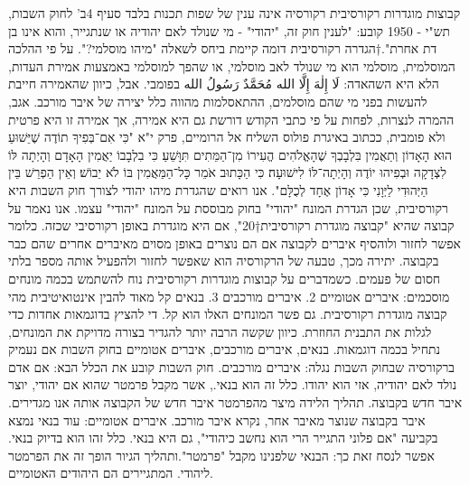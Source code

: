 {קבוצות מוגדרות רקורסיבית
רקורסיה אינה ענין של שפות תכנות בלבד
סעיף 4ב' לחוק השבות, תש"י - 1950 קובע:
"לענין חוק זה, "יהודי" - מי שנולד לאם יהודיה או שנתגייר, והוא אינו בן דת אחרת".†{הגדרה רקורסיבית דומה קיימת ביחס לשאלה "מיהו מוסלמי?". על פי ההלכה המוסלמית, מוסלמי הוא מי שנולד לאב מוסלמי, או שהפך למוסלמי באמצעות אמירת העדות, הלא היא השהאדה: لَا إِلٰهَ إِلَّا الله مُحَمَّدٌ رَسُولُ الله בפומבי. אבל, כיוון שהאמירה חייבת להעשות בפני מי שהם מוסלמים, ההתאסלמות מהווה כלל יצירה של איבר מורכב. אגב, ההמרה לנצרות, לפחות על פי כתבי הקודש דורשת גם היא אמירה, אך אמירה זו היא פרטית ולא פומבית, ככתוב באיגרת פולוס השליח אל הרומיים, פרק י"א "כִּי אִם־בְּפִיךָ תוֹדֶה שֶׁיֵּשׁוּעַ הוּא הָאָדוֹן וְתַאֲמִין בִּלְבָבְךָ שֶׁהָאֱלֹהִים הֱעִירוֹ מִן־הַמֵּתִים תִּוָּשֵׁעַ׃ כִּי בִלְבָבוֹ יַאֲמִין הָאָדָם וְהָיְתָה לּוֹ לִצְדָקָה וּבְפִיהוּ יוֹדֶה וְהָיְתָה־לּוֹ לִישׁוּעָה׃ כִּי הַכָּתוּב אֹמֵר כָּל־הַמַּאֲמִין בּוֹ לֹא יֵבוֹשׁ׃ וְאֵין הַפְרֵשׁ בֵּין הַיְּהוּדִי לַיְּוָנִי כִּי אָדוֹן אֶחָד לְכֻלָּם".}
אנו רואים שהגדרת מיהו יהודי לצורך חוק השבות היא רקורסיבית, שכן הגדרת המונח "יהודי" בחוק מבוססת על המונח "יהודי" עצמו.
אנו נאמר על קבוצה שהיא "קבוצה מוגדרת רקורסיבית†{20}", אם היא מוגדרת באופן רקורסיבי שכזה. כלומר אפשר לחזור ולוהסיף איברים לקבוצה אם הם נוצרים באופן מסוים מאיברים אחרים שהם כבר בקבוצה. יתירה מכך, טבעה של הרקורסיה הוא שאפשר לחזור ולהפעיל אותה מספר בלתי חסום של פעמים.
כשמדברים על קבוצות מוגדרות רקורסיבית נוח להשתמש בכמה מונחים מוסכמים:
איברים אטומיים
2. איברים מורכבים
3. בנאים
קל מאוד להבין אינטואיטיבית מהי קבוצה מוגדרת רקורסיבית. גם פשר המונחים האלו הוא קל. די להציץ בדוגמאות אחדות כדי לגלות את התבנית החוזרת. כיוון שקשה הרבה יותר להגדיר בצורה מדויקת את המונחים, נתחיל בכמה דוגמאות.
בנאים, איברים מורכבים, איברים אטומיים בחוק השבות
אם נעמיק ברקורסיה שבחוק השבות נגלה:
איברים מורכבים. חוק השבות קובע את הכלל הבא: אם אדם נולד לאם יהודיה, אזי הוא יהודו. כלל זה הוא בנאי., אשר מקבל פרמטר שהוא אם יהודי, יוצר איבר חדש בקבוצה. תהליך הלידה מיצר מהפרמטר איבר חדש של הקבוצה אותה אנו מגדירים. איבר בקבוצה שנוצר מאיבר אחר, נקרא איבר מורכב.
איברים אטומיים: עוד בנאי נמצא בקביעה "אם פלוני התגייר הרי הוא נחשב כיהודי", גם היא בנאי. כלל זהו הוא בדיוק בנאי. אפשר לנסח זאת כך: הבנאי שלפנינו מקבל "פרמטר".ותהליך הגיור הופך זה את הפרמטר ליהודי. המתגיירים הם היהודים האטומיים.

}
